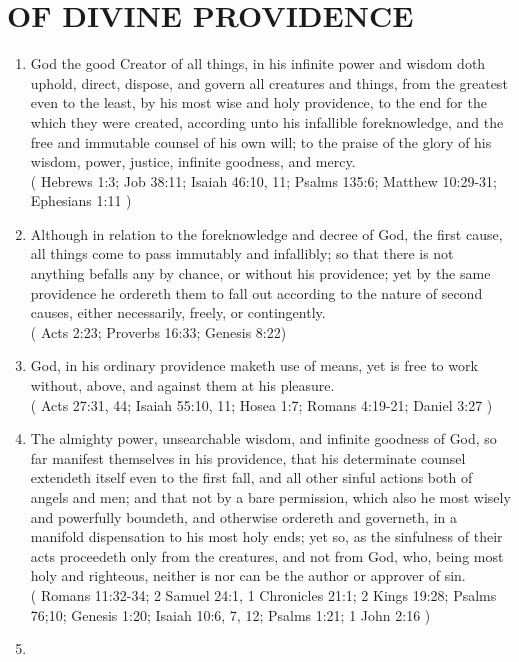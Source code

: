 \documentclass[12pt,a4paper]{book}
\begin{document}
\chapter{OF DIVINE PROVIDENCE}
\label{ch-div-pro}
\begin{enumerate}
\item
\label{ch-div-pro-1}
God the good Creator of all things, in his infinite power and wisdom doth uphold, direct, dispose, and govern all creatures and things, from the greatest even to the least, by his most wise and holy providence, to the end for the which they were created, according unto his infallible foreknowledge, and the free and immutable counsel of his own will; to the praise of the glory of his wisdom, power, justice, infinite goodness, and mercy.\\
( Hebrews 1:3; Job 38:11; Isaiah 46:10, 11; Psalms 135:6; Matthew 10:29-31; Ephesians 1:11 )
\item
\label{ch-div-pro-2}
Although in relation to the foreknowledge and decree of God, the first cause, all things come to pass immutably and infallibly; so that there is not anything befalls any by chance, or without his providence; yet by the same providence he ordereth them to fall out according to the nature of second causes, either necessarily, freely, or contingently.\\
( Acts 2:23; Proverbs 16:33; Genesis 8:22)
\item
\label{ch-div-pro-3}
God, in his ordinary providence maketh use of means, yet is free to work without, above, and against them at his pleasure.\\
( Acts 27:31, 44; Isaiah 55:10, 11; Hosea 1:7; Romans 4:19-21; Daniel 3:27 )
\item
\label{ch-div-pro-4}
The almighty power, unsearchable wisdom, and infinite goodness of God, so far manifest themselves in his providence, that his determinate counsel extendeth itself even to the first fall, and all other sinful actions both of angels and men; and that not by a bare permission, which also he most wisely and powerfully boundeth, and otherwise ordereth and governeth, in a manifold dispensation to his most holy ends; yet so, as the sinfulness of their acts proceedeth only from the creatures, and not from God, who, being most holy and righteous, neither is nor can be the author or approver of sin.\\
( Romans 11:32-34; 2 Samuel 24:1, 1 Chronicles 21:1; 2 Kings 19:28; Psalms 76;10; Genesis 1:20; Isaiah 10:6, 7, 12; Psalms 1:21; 1 John 2:16 )
\item

\end{enumerate}
\end{document}
